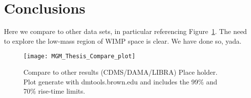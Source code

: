 \section{Conclusions}

Here we compare to other data sets, in particular referencing Figure~\ref{fig:BeGeLimitsComparedToOtherDataSets}.  The need to explore the low-mass region of WIMP space is clear.  We have done so, yada.

		\begin{figure}
			\centering
			\texttt{[image: MGM\_Thesis\_Compare\_plot]}
			\caption{Compare to other results (CDMS/DAMA/LIBRA) Place holder.  Plot generate with
			 dmtools.brown.edu and includes the 99\% and 70\% rise-time limits.}
			\label{fig:BeGeLimitsComparedToOtherDataSets}
		\end{figure}		

